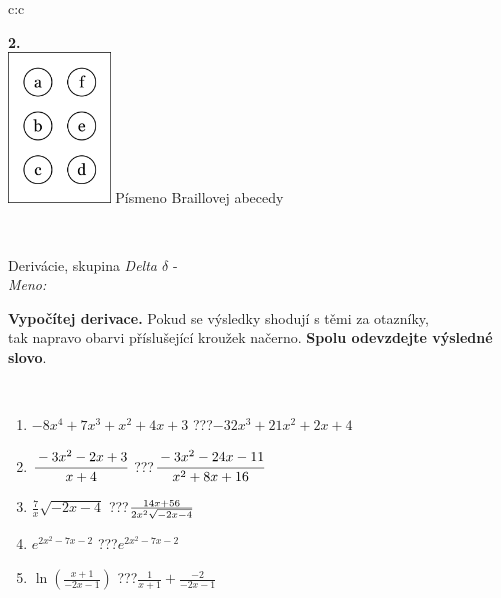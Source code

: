 \documentclass[10pt]{report}
\begin{document}
\begin{tabular}{c:c}
\begin{minipage}[c][104.5mm][t]{0.5\linewidth}
\begin{center}
\begin{minipage}{0.20\linewidth}
\begin{center}
{\Huge\bfseries 2.} \\[2mm]
\includegraphics[height=40mm]{../images/braille.png}
{\small Písmeno Braillovej abecedy}
\end{center}
\end{minipage}
\end{center}
\end{minipage}
\\ \hdashline
\begin{minipage}[c][104.5mm][t]{0.5\linewidth}
\begin{center}
\vspace{7mm}
{\huge Derivácie, skupina \textit{Delta $\delta$} -}\\[5mm]
\textit{Meno:}\phantom{xxxxxxxxxxxxxxxxxxxxxxxxxxxxxxxxxxxxxxxxxxxxxxxxxxxxxxxxxxxxxxxxx}\\[5mm]
\begin{minipage}{0.95\linewidth}
\begin{center}
\textbf{Vypočítej derivace.} Pokud se výsledky shodují s těmi za otazníky,\\tak napravo obarvi příslušející kroužek načerno. \textbf{Spolu odevzdejte výsledné slovo}.
\end{center}
\end{minipage}
\\[1mm]
\begin{minipage}{0.79\linewidth}
\begin{center}
\begin{varwidth}{\linewidth}
\begin{enumerate}
\normalsize
\item $-8x^4+7x^3+x^2+4x+3$\quad \dotfill\; ???\;\dotfill \quad $-32x^3+21x^2+2x+4$
\item $\cfrac{-3x^2-2x+3}{x+4}$\quad \dotfill\; ???\;\dotfill \quad $\cfrac{-3x^2-24x-11}{x^2+8x+16}$
\item $\frac{7}{x}\sqrt{-2x-4}$\quad \dotfill\; ???\;\dotfill \quad $\frac{14x+56}{2x^2 \sqrt{\smash[b]{-2x-4}}}$
\item $e^{2x^2-7x-2}$\quad \dotfill\; ???\;\dotfill \quad $e^{2x^2-7x-2}$
\item $\ln{\left(\frac{x+1}{-2x-1}\right)}$\quad \dotfill\; ???\;\dotfill \quad $\frac{1}{x+1}+\frac{-2}{-2x-1}$

\end{enumerate}
\end{varwidth}
\end{center}
\end{minipage}
\end{center}
\end{minipage}
\end{tabular}
\end{document}
